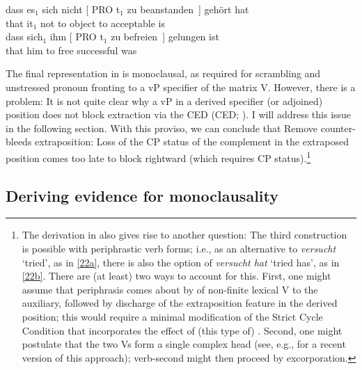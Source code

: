 \documentclass[output=paper]{langsci/langscibook}
\begin{document}
\ea\label{ex:end} 
    \ea
        \gll dass es$_1$ sich nicht [ PRO t$_1$ zu beanstanden~] {gehört hat}\\
            that it$_1$ \Refl{} not {} {} {}  to {object to} {acceptable is}\\
    \ex
        \gll dass sich$_1$ ihm [ PRO t$_1$ zu befreien~] {gelungen ist}\\
            that \Refl{} him\textsubscript{\Dat}  {} {} {} to free {successful was}\\
    \z
\z

The final representation in  is monoclausal, as required for
scrambling and unstressed pronoun fronting to a vP specifier of the matrix V.
However, there is a problem: It is not quite clear why a vP in a derived
specifier (or adjoined) position does not block extraction via the
\glsdesc{CED} (\gls{CED};
\citealt{Huang:82,Chomsky:86,Cinque:90}).  I will address this issue in the
following section. With this proviso, we can conclude that Remove
counter-bleeds extraposition: Loss of the CP status of the complement in the
extraposed position comes too late to block rightward  (which requires
CP status).\footnote{The derivation in  also gives rise to
    another question: The third construction is possible with periphrastic verb
    forms; i.e., as an alternative to {\itshape versucht} \enquote*{tried}, as in
    \eqref{22a}, there is also the option of {\itshape versucht hat} \enquote*{tried
    has}, as in \eqref{22b}. There are (at least) two ways to account for this.
    First, one might assume that periphrasis comes about by  of
    non-finite lexical V to the auxiliary, followed by discharge of the
    extraposition feature in the derived position; this would require a minimal
    modification of the Strict Cycle Condition that incorporates the effect of
(this type of) . Second, one might postulate that the two Vs form
a single complex head (see, e.g., \citealt{Zwart:16} for a recent version of
this approach); verb-second  might then proceed  by excorporation.}

\subsection{Deriving evidence for monoclausality}
\end{document}
